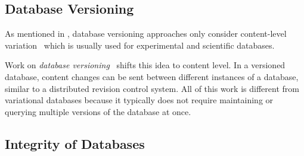 \subsection{Database Versioning}
\label{sec:db-ver}
As mentioned in , database versioning approaches only consider
content-level variation~\cite{dbVersioning} which is usually used for experimental and
scientific databases.

Work on \emph{database versioning}~\cite{datasetVersioning,dbVersioning}
shifts this idea to content level. In a versioned database, 
content changes can be sent between different instances of a database,
similar to a distributed revision control system.
%
All of this work is different from variational databases because it typically
does not require maintaining or querying multiple versions of the database at
once.
%

\subsection{Integrity of Databases}
\label{sec:integ}

